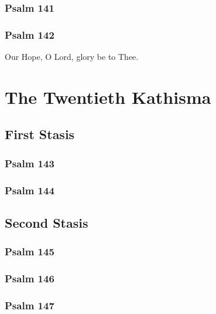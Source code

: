 \documentclass[12pt]{book}
\newcommand{\kathismabreak}{
  \medskip
  \begin{center}
  \begin{footnotesize}
  

  

  

  
  \end{footnotesize}
  \end{center}
  \smallbreak
}
\newcommand{\kathismaend}{
  \medskip
  \begin{center}
  \begin{footnotesize}
  

  

  Our Hope, O Lord, glory be to Thee.
  \end{footnotesize}
  \end{center}
  \smallbreak
}
\begin{document}
\subsubsection{Psalm 141}


\subsubsection{Psalm 142}


\pagebreak %
\kathismaend

\section{The Twentieth Kathisma}

\subsection{First Stasis}

\subsubsection{Psalm 143}


\subsubsection{Psalm 144}


\kathismabreak

\subsection{Second Stasis}

\subsubsection{Psalm 145}


\subsubsection{Psalm 146}


\subsubsection{Psalm 147}

\end{document}
